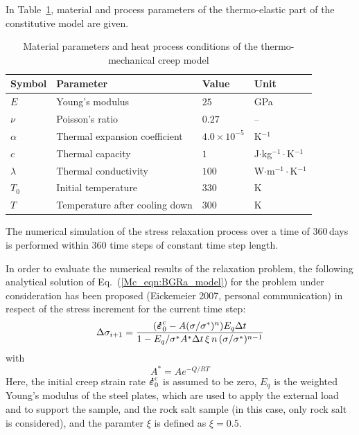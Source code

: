 In Table~\ref{Mc_tab:creep_salt_heat}, material and process parameters of the thermo-elastic part of the constitutive model are given.
%
\begin{table}[!htb]
\centering
\caption{Material parameters and heat process conditions of the thermo-mechanical creep model}
\label{Mc_tab:creep_salt_heat}
\begin{tabular}{llll}
\toprule
Symbol & Parameter & Value & Unit \\
\midrule
$E$       & Young's modulus                & $25$                & GPa                            \\
$\nu$     & Poisson's ratio                & $0.27$              & --                             \\
$\alpha$  & Thermal expansion coefficient  & $4.0\times 10^{-5}$ & K$^{-1}$                       \\
$c$       & Thermal capacity               & $1$                 & J$\cdot$kg$^{-1}\cdot$K$^{-1}$ \\
$\lambda$ & Thermal conductivity           & $100$               & W$\cdot$m$^{-1}\cdot$K$^{-1}$  \\
\cmidrule{1-4}
$T_0$     & Initial temperature            & $330$               & K                              \\
$T$       & Temperature after cooling down & $300$               & K                              \\
\bottomrule
\end{tabular}
\end{table}

The numerical simulation of the stress relaxation process over a time of $360\,$days is performed within 360 time steps of constant time step length.

In order to evaluate the numerical results of the relaxation problem, the following analytical solution of Eq.~(\ref{Mc_eqn:BGRa_model}) for the problem under consideration has been proposed (Eickemeier 2007, personal communication) in respect of the stress increment for the current time step:
%
\begin{equation}
\Delta\sigma_{i+1}
=
\frac
{(\mib{\varepsilon}{0}{\mathrm{c}}{\dot} - A (\sigma/\sigma^*)^n) E_q \Delta t}
{1 - E_q / \sigma^* A^* \Delta t\,\xi\,n\,(\sigma/\sigma^*)^{n-1}}
\label{Mc_eqn:BGRa_model_2}
\end{equation}
%
with
%
\begin{equation}
A^*
=
A e^{-Q/RT}
\label{Mc_eqn:BGRa_model_3}
\end{equation}
%
Here, the initial creep strain rate $\mbox{${\mbox{\boldmath$\dot{\varepsilon}$\unboldmath}}_{\:\!0}^{\:\!\mathrm{c}}$}$ is assumed to be zero, $E_q$ is the weighted Young's modulus of the steel plates, which are used to apply the external load and to support the sample, and the rock salt sample (in this case, only rock salt is considered), and the paramter $\xi$ is defined as $\xi=0.5$.

